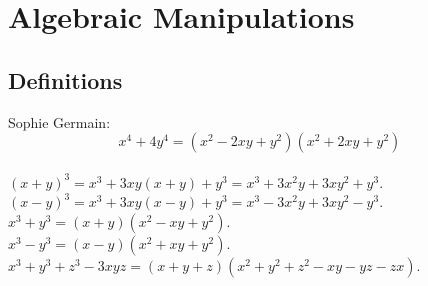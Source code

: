 \section{Algebraic Manipulations}
\subsection{Definitions}
Sophie Germain: \[x^4 + 4y^4 = (x^2-2xy+y^2)(x^2+2xy+y^2)\] \\
$(x+y)^3 = x^3+3xy(x+y)+y^3 = x^3+3x^2y+3xy^2+y^3$. \\
$(x-y)^3 = x^3+3xy(x-y)+y^3 = x^3-3x^2y+3xy^2-y^3$. \\
$x^3 + y^3 = (x+y)(x^2-xy+y^2)$. \\
$x^3 - y^3 = (x-y)(x^2+xy+y^2)$. \\
$x^3+y^3+z^3-3xyz = (x+y+z)(x^2+y^2+z^2−xy−yz−zx)$.

